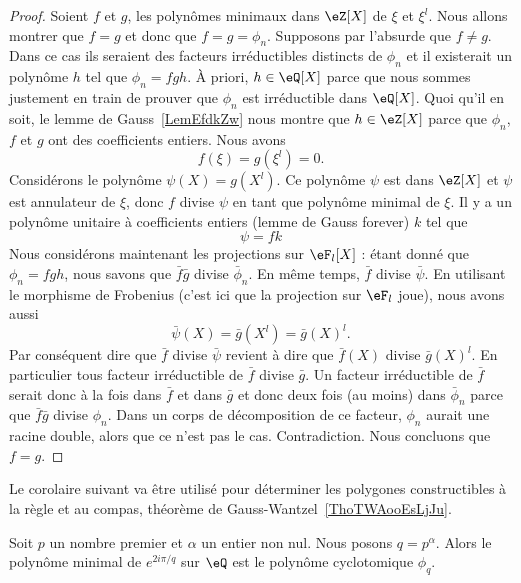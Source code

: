 \begin{proof}
    Soient \( f\) et \( g\), les polynômes minimaux dans \( \eZ[X]\) de \( \xi\) et \( \xi^l\). Nous allons montrer que \( f=g\) et donc que \( f=g=\phi_n\). Supposons par l'absurde que \( f\neq g\). Dans ce cas ils seraient des facteurs irréductibles distincts de \( \phi_n\) et il existerait un polynôme \( h\) tel que \( \phi_n=fgh\). À priori, \( h\in \eQ[X]\) parce que nous sommes justement en train de prouver que \( \phi_n\) est irréductible dans \( \eQ[X]\). Quoi qu'il en soit, le lemme de Gauss~\ref{LemEfdkZw} nous montre que \( h\in \eZ[X]\) parce que \( \phi_n\), \( f\) et \( g\) ont des coefficients entiers. Nous avons
    \begin{equation}
        f(\xi)=g(\xi^l)=0.
    \end{equation}
    Considérons le polynôme \( \psi(X)=g(X^l)\). Ce polynôme \( \psi\) est dans \( \eZ[X]\) et \( \psi\) est annulateur de \( \xi\), donc \( f\) divise \( \psi\) en tant que polynôme minimal de \( \xi\). Il y a un polynôme unitaire à coefficients entiers (lemme de Gauss forever) \( k\) tel que
    \begin{equation}
        \psi=fk
    \end{equation}
    Nous considérons maintenant les projections sur \( \eF_l[X]\) : étant donné que \( \phi_n=fgh\), nous savons que \( \bar f\bar g\) divise \( \bar\phi_n\). En même temps, \( \bar f\) divise \( \bar \psi\). En utilisant le morphisme de Frobenius (c'est ici que la projection sur \( \eF_l\) joue), nous avons aussi
    \begin{equation}
        \bar\psi(X)=\bar g(X^l)=\bar g(X)^l.
    \end{equation}
    Par conséquent dire que \( \bar f\) divise \( \bar\psi\) revient à dire que \( \bar f(X)\) divise \( \bar g(X)^l\). En particulier tous facteur irréductible de \( \bar f\) divise \( \bar g\). Un facteur irréductible de \( \bar f\) serait donc à la fois dans \( \bar f\) et dans \( \bar g\) et donc deux fois (au moins) dans \( \bar\phi_n\) parce que \( \bar f\bar g\) divise \( \phi_n\). Dans un corps de décomposition de ce facteur, \( \phi_n\) aurait une racine double, alors que ce n'est pas le cas. Contradiction. Nous concluons que \( f=g\).
\end{proof}

Le corolaire suivant va être utilisé pour déterminer les polygones constructibles à la règle et au compas, théorème de Gauss-Wantzel~\ref{ThoTWAooEsLjJu}.
\begin{corollary}   \label{CorKRTooTJtyvP}
    Soit \( p\) un nombre premier et \( \alpha\) un entier non nul. Nous posons \( q=p^{\alpha}\). Alors le polynôme minimal de \(  e^{2 i\pi/q}\) sur \( \eQ\) est le polynôme cyclotomique \( \phi_q\).
\end{corollary}

